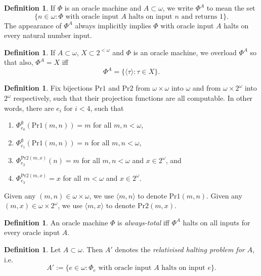 \documentclass[12pt, twoside]{memoir}
\numberwithin{equation}{section}
\theoremstyle{definition}
\newtheorem{defi}[thm]{Definition}
\theoremstyle{remark}
\theoremstyle{definition}
\theoremstyle{definition}
\theoremstyle{definition}
\theoremstyle{remark}
\begin{document}
\begin{defi}
If $\Phi$ is an oracle machine and $A \subset \omega$, we write $\Phi^A$ to mean the set
\begin{equation*}
    \{n \in \omega : \Phi \text{ with oracle input } A \text{ halts on input } n \text{ and returns } 1\} \text{.}
\end{equation*}
The appearance of $\Phi^A$ always implicitly implies $\Phi$ with oracle input $A$ halts on every natural number input. 
\end{defi}

\begin{defi}
If $A \subset \omega$, $X \subset 2^{< \omega}$ and $\Phi$ is an oracle machine, we overload $\Phi^A$ so that also, $\Phi^A = X$ iff
\begin{equation*}
    \Phi^A = \{\langle \tau \rangle : \tau \in X\} \text{.}
\end{equation*}
\end{defi}

\begin{defi}
Fix bijections $\mathrm{Pr1}$ and $\mathrm{Pr2}$ from $\omega \times \omega$ into $\omega$ and from $\omega \times 2^{\omega}$ into $2^{\omega}$ respectively, such that their projection functions are all computable. In other words, there are $e_i$ for $i < 4$, such that
\begin{enumerate}[label=(\alph*)]
    \item $\Phi^{\emptyset}_{e_0}(\mathrm{Pr1}(m, n)) = m$ for all $m, n < \omega$, 
    \item $\Phi^{\emptyset}_{e_1}(\mathrm{Pr1}(m, n)) = n$ for all $m, n < \omega$, 
    \item $\Phi^{\mathrm{Pr2}(m, x)}_{e_2}(n) = m$ for all $m, n < \omega$ and $x \in 2^{\omega}$, and
    \item $\Phi^{\mathrm{Pr2}(m, x)}_{e_3} = x$ for all $m < \omega$ and $x \in 2^{\omega}$.
\end{enumerate}
Given any $(m, n) \in \omega \times \omega$, we use $\langle m, n \rangle$ to denote $\mathrm{Pr1}(m, n)$. Given any $(m, x) \in \omega \times 2^{\omega}$, we use $\langle m, x \rangle$ to denote $\mathrm{Pr2}(m, x)$.
\end{defi}

\begin{defi}
An oracle machine $\Phi$ is \emph{always-total} iff $\Phi^A$ halts on all inputs for every oracle input $A$.
\end{defi}

\begin{defi}
Let $A \subset \omega$. Then $A'$ denotes the \emph{relativised halting problem for} $A$, i.e. $$A' := \{e \in \omega : \Phi_e \text{ with oracle input } A \text{ halts on input } e\} \text{.}$$ 
\end{defi}
\end{document}
